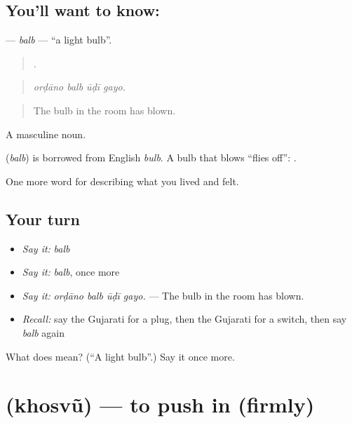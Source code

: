 \subsection*{You'll want to know: }
\textbf{} — \emph{balb} — \textquotedblleft{}a light bulb\textquotedblright{}.

\begin{quote}
   .
\end{quote}

\begin{quote}
\emph{orḍāno balb ūḍī gayo.}
\end{quote}

\begin{quote}
The bulb in the room has blown.
\end{quote}

A masculine noun.

\begin{cousinweb}
\textbf{} (\emph{balb}) is borrowed from English \emph{bulb}. A bulb that blows \textquotedblleft{}flies off\textquotedblright{}: \textbf{  }.
\end{cousinweb}

\begin{grammarlens}[title={What you've built}]
One more word for describing what you lived and felt.
\end{grammarlens}

\subsection*{Your turn}
\begin{itemize}
\raggedright
  \item \emph{Say it:} \emph{balb}
  \item \emph{Say it:} \emph{balb}, once more
  \item \emph{Say it:} \emph{orḍāno balb ūḍī gayo.} — The bulb in the room has blown.
  \item \emph{Recall:} say the Gujarati for a plug, then the Gujarati for a switch, then say \emph{balb} again
\end{itemize}

\begin{tcolorbox}[breakable,colback=teal!4,colframe=teal!35!black,title={Before you move on}]
What does  mean? (\textquotedblleft{}A light bulb\textquotedblright{}.) Say it once more.
\end{tcolorbox}
\section[\texorpdfstring{\gu{ખોસવું} (khosvũ)}{ખોસવું (khosvũ)}]{ (khosvũ) — to push in (firmly)}

